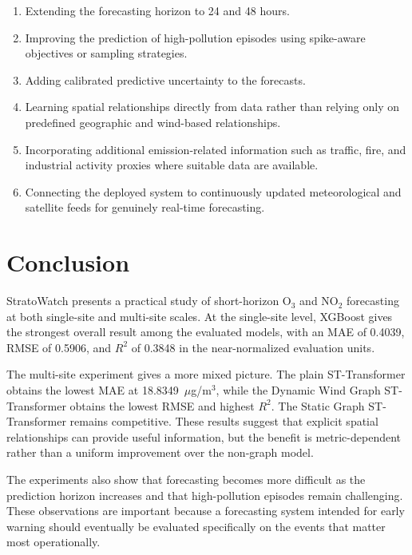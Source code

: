 \documentclass[conference]{IEEEtran}
\begin{document}
\begin{enumerate}
\item Extending the forecasting horizon to 24 and 48 hours.
\item Improving the prediction of high-pollution episodes using spike-aware objectives or
sampling strategies.
\item Adding calibrated predictive uncertainty to the forecasts.
\item Learning spatial relationships directly from data rather than relying only on
predefined geographic and wind-based relationships.
\item Incorporating additional emission-related information such as traffic, fire, and
industrial activity proxies where suitable data are available.
\item Connecting the deployed system to continuously updated meteorological and
satellite feeds for genuinely real-time forecasting.
\end{enumerate}

\section{Conclusion}

StratoWatch presents a practical study of short-horizon O$_3$ and NO$_2$ forecasting at both
single-site and multi-site scales. At the single-site level, XGBoost gives the strongest
overall result among the evaluated models, with an MAE of 0.4039, RMSE of 0.5906, and
$R^2$ of 0.3848 in the near-normalized evaluation units.

The multi-site experiment gives a more mixed picture. The plain ST-Transformer obtains the
lowest MAE at 18.8349~$\mu$g/m$^3$, while the Dynamic Wind Graph ST-Transformer obtains the
lowest RMSE and highest $R^2$. The Static Graph ST-Transformer remains competitive. These
results suggest that explicit spatial relationships can provide useful information, but the
benefit is metric-dependent rather than a uniform improvement over the non-graph model.

The experiments also show that forecasting becomes more difficult as the prediction horizon
increases and that high-pollution episodes remain challenging. These observations are
important because a forecasting system intended for early warning should eventually be
evaluated specifically on the events that matter most operationally.
\end{document}
